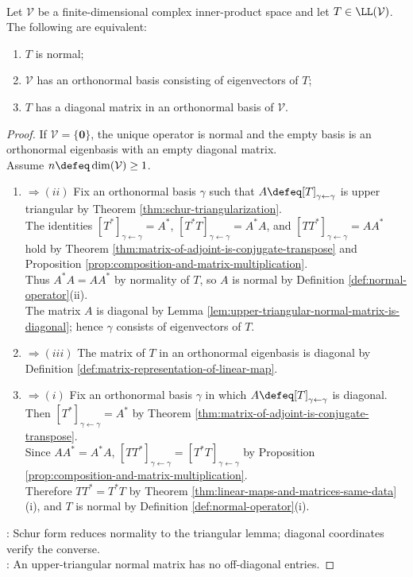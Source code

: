 \begin{theorem} \label{thm:complex-spectral-theorem} \\
Let $\mathcal{V}$ be a finite-dimensional complex inner-product space and let $T\in\LL(\mathcal{V})$. The following are equivalent:
\begin{enumerate}[label=(\roman*)]
\setlength{\itemsep}{0pt}
\item $T$ is normal;
\item $\mathcal{V}$ has an orthonormal basis consisting of eigenvectors of $T$;
\item $T$ has a diagonal matrix in an orthonormal basis of $\mathcal{V}$.
\end{enumerate}
\begin{proof}
If $\mathcal{V}=\{\mathbf{0}\}$, the unique operator is normal and the empty basis is an orthonormal eigenbasis with an empty diagonal matrix.\\
Assume $n\defeq\dim(\mathcal{V})\geq1$.
\begin{enumerate}[label=(\roman*)]
\setlength{\itemsep}{0pt}
\item[$(i)$] $\Rightarrow (ii)$ Fix an orthonormal basis $\gamma$ such that $A\defeq[T]_{\gamma\leftarrow\gamma}$ is upper triangular by Theorem \ref{thm:schur-triangularization}.\\
The identities $[T^*]_{\gamma\leftarrow\gamma}=A^*$, $[T^*T]_{\gamma\leftarrow\gamma}=A^*A$, and $[TT^*]_{\gamma\leftarrow\gamma}=AA^*$ hold by Theorem \ref{thm:matrix-of-adjoint-is-conjugate-transpose} and Proposition \ref{prop:composition-and-matrix-multiplication}.\\
Thus $A^*A=AA^*$ by normality of $T$, so $A$ is normal by Definition \ref{def:normal-operator}(ii).\\
The matrix $A$ is diagonal by Lemma \ref{lem:upper-triangular-normal-matrix-is-diagonal}; hence $\gamma$ consists of eigenvectors of $T$.
\item[$(ii)$] $\Rightarrow (iii)$ The matrix of $T$ in an orthonormal eigenbasis is diagonal by Definition \ref{def:matrix-representation-of-linear-map}.
\item[$(iii)$] $\Rightarrow (i)$ Fix an orthonormal basis $\gamma$ in which $A\defeq[T]_{\gamma\leftarrow\gamma}$ is diagonal. Then $[T^*]_{\gamma\leftarrow\gamma}=A^*$ by Theorem \ref{thm:matrix-of-adjoint-is-conjugate-transpose}.\\
Since $AA^*=A^*A$, $[TT^*]_{\gamma\leftarrow\gamma}=[T^*T]_{\gamma\leftarrow\gamma}$ by Proposition \ref{prop:composition-and-matrix-multiplication}.\\
Therefore $TT^*=T^*T$ by Theorem \ref{thm:linear-maps-and-matrices-same-data}(i), and $T$ is normal by Definition \ref{def:normal-operator}(i).
\end{enumerate}
: Schur form reduces normality to the triangular lemma; diagonal coordinates verify the converse.\\
: An upper-triangular normal matrix has no off-diagonal entries.
\end{proof}
\end{theorem}

